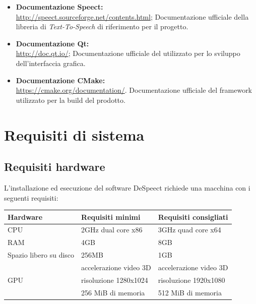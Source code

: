 \documentclass[openany,12pt,a4paper]{report}
\begin{document}
	\begin{itemize}
		\item \textbf{Documentazione Speect:} \\
		\url{http://speect.sourceforge.net/contents.html};
		\subitem Documentazione ufficiale della libreria di \textit{Text-To-Speech} di riferimento per il progetto.
		
		\item \textbf{Documentazione Qt:} \\
		\url{http://doc.qt.io/};
		\subitem Documentazione ufficiale del  utilizzato per lo sviluppo dell'interfaccia grafica.
		
		\item \textbf{Documentazione CMake:} \\
		\url{https://cmake.org/documentation/}.
		\subitem Documentazione ufficiale del framework utilizzato per la build del prodotto. 
	\end{itemize}

	\chapter{Requisiti di sistema}
	
	\section{Requisiti hardware}
	
	L'installazione ed esecuzione del software DeSpeect richiede una macchina con i seguenti requisiti:
	\begin{center}
		\begin{longtable}{| p{40mm} | p{60mm} | p{60mm} |}
			\hline
			\textbf{Hardware} & \textbf{Requisiti minimi} & \textbf{Requisiti consigliati} \\
			\hline CPU & 2GHz dual core x86 & 3GHz quad core x64 \\
			\hline RAM & 4GB & 8GB \\
			\hline Spazio libero su disco & 256MB & 1GB \\
			\hline  \multirow{3}{*}{GPU}
			& accelerazione video 3D & accelerazione video 3D \\ 
			& risoluzione 1280x1024 & risoluzione 1920x1080 \\
			& 256 MiB di memoria & 512 MiB di memoria \\
			\hline
		\end{longtable}
	\end{center}
\end{document}
